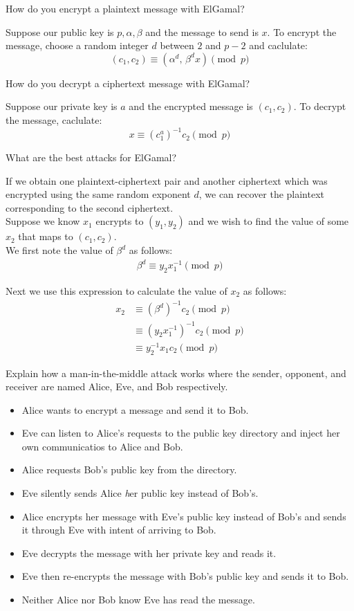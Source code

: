 \documentclass{article}
\newcounter{qcounter}
\newcommand{\showqcounter}{\theqcounter}
\newcommand{\question}{\vspace{5mm}\addtocounter{qcounter}{1}\vspace{5mm}{\bf Q\showqcounter: }}
\newcommand{\answer}{\vspace{5mm}{\bf A\showqcounter: }}
\begin{document}
\question How do you encrypt a plaintext message with ElGamal?

\answer Suppose our public key is $p, \alpha, \beta$ and the message to send is $x$. 
  To encrypt the message, choose a random integer $d$ between $2$ and $p - 2$ and caclulate:
  $$
    (c_1, c_2) \equiv \left(\alpha^d,\, \beta^d x \right) \pmod{p}
  $$


\question How do you decrypt a ciphertext message with ElGamal?

\answer Suppose our private key is $a$ and the encrypted message is $(c_1, c_2)$. To decrypt the message, caclulate:
  $$
    x \equiv (c_1^a)^{-1}c_2 \pmod{p}
  $$


\question What are the best attacks for ElGamal?

\answer If we obtain one plaintext-ciphertext pair and another ciphertext which was encrypted using the same random exponent 
  $d$, we can recover the plaintext corresponding to the second ciphertext. \\
  
  Suppose we know $x_1$ encrypts to $(y_1, y_2)$ and we wish to find the value of some $x_2$ that maps to $(c_1, c_2)$. \\
  
  We first note the value of $\beta^d$ as follows:
  \begin{align*}
    \beta^d \equiv y_2 x_1^{-1} \pmod{p}
  \end{align*}

  Next we use this expression to calculate the value of $x_2$ as follows:
  \begin{align*}
    x_2 &\equiv \left(\beta^d\right)^{-1} c_2 \pmod{p}\\
        &\equiv \left( y_2 x_1^{-1} \right)^{-1} c_2 \pmod{p}\\
        &\equiv y_2^{-1} x_1 c_2 \pmod{p}
  \end{align*}


\question Explain how a man-in-the-middle attack works where the sender, opponent, and receiver are named Alice, Eve, and Bob respectively.

\answer 
  \begin{itemize}
    \item Alice wants to encrypt a message and send it to Bob.
    \item Eve can listen to Alice's requests to the public key directory and inject her own communicatios to Alice and Bob.
    \item Alice requests Bob's public key from the directory.
    \item Eve silently sends Alice {\emph her} public key instead of Bob's.
    \item Alice encrypts her message with Eve's public key instead of Bob's and sends it through Eve with intent of arriving to Bob.
    \item Eve decrypts the message with her private key and reads it.
    \item Eve then re-encrypts the message with Bob's public key and sends it to Bob.
    \item Neither Alice nor Bob know Eve has read the message.
  \end{itemize}
\end{document}
